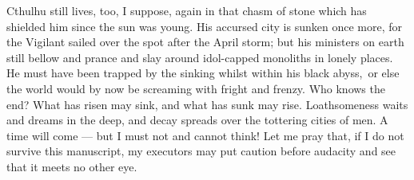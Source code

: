 Cthulhu still lives, too, I suppose, again in that chasm of stone which
has shielded him since the sun was young. His accursed city is sunken
once more, for the Vigilant sailed over the spot after the April storm;
but his ministers on earth still bellow and prance and slay around
idol-capped monoliths in lonely places. He must have been trapped by the
sinking whilst within his black abyss,\est\ or else the world would by now be
screaming with fright and frenzy. Who knows the end? What has risen may
sink, and what has sunk may rise. Loathsomeness waits and dreams in the
deep, and decay spreads over the tottering cities of men. A time will
come --- but I must not and cannot think! Let me pray that, if I do not
survive this manuscript, my executors may put caution before audacity
and see that it meets no other eye.